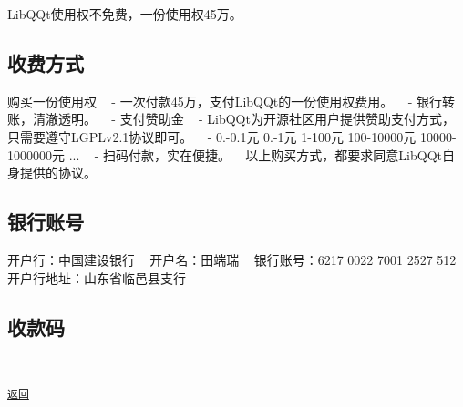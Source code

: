 Lib\+Q\+Qt使用权不免费，一份使用权45万。 ~\newline


\subsection*{收费方式}


\begin{DoxyItemize}
\item 购买一份使用权 ~\newline
 -\/ 一次付款45万，支付\+Lib\+Q\+Qt的一份使用权费用。 ~\newline
 -\/ 银行转账，清澈透明。 ~\newline
-\/ 支付赞助金 ~\newline
 -\/ Lib\+Q\+Qt为开源社区用户提供赞助支付方式，只需要遵守\+L\+G\+P\+Lv2.1协议即可。 ~\newline
 -\/ 0.-\/0.\+1元 0.-\/1元 1-\/100元 100-\/10000元 10000-\/1000000元 ... ~\newline
 -\/ 扫码付款，实在便捷。 ~\newline
 以上购买方式，都要求同意\+Lib\+Q\+Qt自身提供的协议。 ~\newline
 \subsection*{银行账号}
\end{DoxyItemize}

开户行：中国建设银行 ~\newline
开户名：田端瑞 ~\newline
银行账号：6217 0022 7001 2527 512 ~\newline
开户行地址：山东省临邑县支行 ~\newline


\subsection*{收款码}

 ~\newline


\href{.}{\tt 返回} 